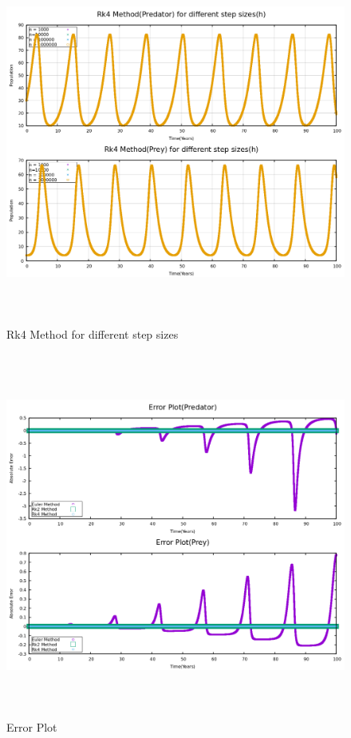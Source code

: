 \documentclass[12pt]{article}
\begin{document}
\newpage
\begin{figure}[h] %
    \centering
    \includegraphics[width=15cm,height=12cm]{rk4_diff_h.png}
\caption{Rk4 Method for different step sizes}
\end{figure}
\newpage
\begin{figure}[h]
    \centering
    \includegraphics[width=15cm,height=12cm]{error_plot.png}
\caption{Error Plot }
\end{figure}
\end{document}
